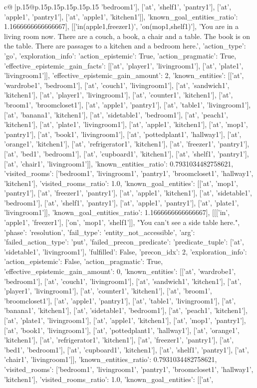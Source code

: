 \documentclass{article}
\begin{document}
{\begin{supertabular}{c@{$\;$}|p{.15\linewidth}@{}p{.15\linewidth}p{.15\linewidth}p{.15\linewidth}p{.15\linewidth}p{.15\linewidth}}
{{{'bedroom1'], ['at', 'shelf1', 'pantry1'], ['at', 'apple1', 'pantry1'], ['at', 'apple1', 'kitchen1']], 'known_goal_entities_ratio': 1.1666666666666667}}], [['in(apple1,freezer1)', 'on(mop1,shelf1)'], 'You are in a living room now. There are a couch, a book, a chair and a table. The book is on the table. There are passages to a kitchen and a bedroom here.', {'action_type': 'go', 'exploration_info': {'action_epistemic': True, 'action_pragmatic': True, 'effective_epistemic_gain_facts': [['at', 'player1', 'livingroom1'], ['at', 'plate1', 'livingroom1']], 'effective_epistemic_gain_amount': 2, 'known_entities': [['at', 'wardrobe1', 'bedroom1'], ['at', 'couch1', 'livingroom1'], ['at', 'sandwich1', 'kitchen1'], ['at', 'player1', 'livingroom1'], ['at', 'counter1', 'kitchen1'], ['at', 'broom1', 'broomcloset1'], ['at', 'apple1', 'pantry1'], ['at', 'table1', 'livingroom1'], ['at', 'banana1', 'kitchen1'], ['at', 'sidetable1', 'bedroom1'], ['at', 'peach1', 'kitchen1'], ['at', 'plate1', 'livingroom1'], ['at', 'apple1', 'kitchen1'], ['at', 'mop1', 'pantry1'], ['at', 'book1', 'livingroom1'], ['at', 'pottedplant1', 'hallway1'], ['at', 'orange1', 'kitchen1'], ['at', 'refrigerator1', 'kitchen1'], ['at', 'freezer1', 'pantry1'], ['at', 'bed1', 'bedroom1'], ['at', 'cupboard1', 'kitchen1'], ['at', 'shelf1', 'pantry1'], ['at', 'chair1', 'livingroom1']], 'known_entities_ratio': 0.7931034482758621, 'visited_rooms': ['bedroom1', 'livingroom1', 'pantry1', 'broomcloset1', 'hallway1', 'kitchen1'], 'visited_rooms_ratio': 1.0, 'known_goal_entities': [['at', 'mop1', 'pantry1'], ['at', 'freezer1', 'pantry1'], ['at', 'apple1', 'kitchen1'], ['at', 'sidetable1', 'bedroom1'], ['at', 'shelf1', 'pantry1'], ['at', 'apple1', 'pantry1'], ['at', 'plate1', 'livingroom1']], 'known_goal_entities_ratio': 1.1666666666666667}}], [[['in', 'apple1', 'freezer1'], ['on', 'mop1', 'shelf1']], "You can't see a side table here.", {'phase': 'resolution', 'fail_type': 'entity_not_accessible', 'arg': {'failed_action_type': 'put', 'failed_precon_predicate': {'predicate_tuple': ['at', 'sidetable1', 'livingroom1'], 'fulfilled': False, 'precon_idx': 2}}, 'exploration_info': {'action_epistemic': False, 'action_pragmatic': True, 'effective_epistemic_gain_amount': 0, 'known_entities': [['at', 'wardrobe1', 'bedroom1'], ['at', 'couch1', 'livingroom1'], ['at', 'sandwich1', 'kitchen1'], ['at', 'player1', 'livingroom1'], ['at', 'counter1', 'kitchen1'], ['at', 'broom1', 'broomcloset1'], ['at', 'apple1', 'pantry1'], ['at', 'table1', 'livingroom1'], ['at', 'banana1', 'kitchen1'], ['at', 'sidetable1', 'bedroom1'], ['at', 'peach1', 'kitchen1'], ['at', 'plate1', 'livingroom1'], ['at', 'apple1', 'kitchen1'], ['at', 'mop1', 'pantry1'], ['at', 'book1', 'livingroom1'], ['at', 'pottedplant1', 'hallway1'], ['at', 'orange1', 'kitchen1'], ['at', 'refrigerator1', 'kitchen1'], ['at', 'freezer1', 'pantry1'], ['at', 'bed1', 'bedroom1'], ['at', 'cupboard1', 'kitchen1'], ['at', 'shelf1', 'pantry1'], ['at', 'chair1', 'livingroom1']], 'known_entities_ratio': 0.7931034482758621, 'visited_rooms': ['bedroom1', 'livingroom1', 'pantry1', 'broomcloset1', 'hallway1', 'kitchen1'], 'visited_rooms_ratio': 1.0, 'known_goal_entities': [['at', }}}
\end{supertabular}}
\end{document}
